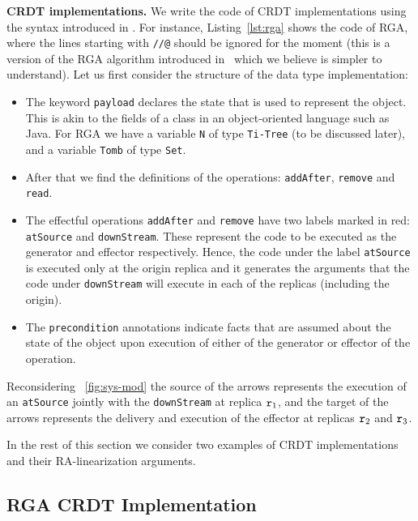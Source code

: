 \noindent
{\bf CRDT implementations.}
We write the code of CRDT implementations using the syntax introduced in \citet{ShapiroPBZ11}.
%
For instance, Listing~\ref{lst:rga} shows the code of RGA, 
where the lines starting with \lstinline|//@| should be ignored for the moment 
(this is a version of the RGA algorithm introduced in~\cite{AttiyaBGMYZ16}
which we believe is simpler to understand).
%
Let us first consider the structure of the data type implementation:
\begin{itemize}
\item The keyword \lstinline|payload| declares the state that is
  used to represent the object. This is akin to the fields of a class
  in an object-oriented language such as Java. For RGA we have a
  variable \lstinline|N| of type \lstinline|Ti-Tree| (to be discussed
  later), and a variable \lstinline|Tomb| of type \lstinline|Set|.
\item After that we find the definitions of the operations: \lstinline|addAfter|,
  \lstinline|remove| and \lstinline|read|.
\item The effectful operations \lstinline|addAfter| and
  \lstinline|remove| have two labels marked in red:
  \lstinline|atSource| and \lstinline|downStream|.
  These represent the code to be executed as the generator and
  effector respectively. Hence, the code under the label
  \lstinline|atSource| is executed only at the origin replica and it
  generates the arguments that the code under \lstinline|downStream|
  will execute in each of the replicas (including the origin).
\item The 
  \lstinline|precondition| annotations indicate facts that are
  assumed about the state of the object upon execution of either of
  the generator or effector of the operation.
\end{itemize}
Reconsidering \figureautorefname~\ref{fig:sys-mod} the
source of the arrows represents the execution of an
\lstinline|atSource| jointly with the \lstinline|downStream| at
replica $\mathtt{r}_1$, and the target of the arrows represents the
delivery and execution of the effector at replicas $\mathtt{r}_2$ and
$\mathtt{r}_3$.


In the rest of this section we consider two examples of CRDT
implementations and their RA-linearization arguments.

\subsection{RGA CRDT Implementation}
\label{sec:rga-crdt-impl}


